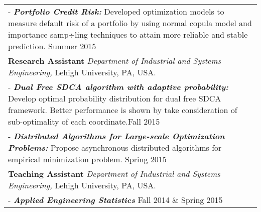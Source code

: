 \documentclass[letters,11pt]{article} %
\begin{document}
\begin{tabular}{p{17.5cm}}
\footnotesize{- \textbf{\emph{Portfolio Credit Risk: }} }
Developed optimization models to measure default risk of a portfolio by using normal copula model and importance samp÷ling techniques to attain more reliable and stable prediction. \hfill{Summer 2015}\\
\textbf{Research Assistant} \emph{Department of Industrial and Systems Engineering,} Lehigh University, PA, USA. \\
\footnotesize{- \textbf{\emph{Dual Free SDCA algorithm with adaptive probability:}} Develop optimal probability distribution for dual free SDCA framework. Better performance is shown by take consideration of sub-optimality of each coordinate.\hfill{Fall 2015}}\\
\footnotesize{- \textbf{\emph{Distributed Algorithms for Large-scale Optimization Problems:}} Propose asynchronous distributed algorithms for empirical minimization problem. \hfill{Spring 2015}}\\
\textbf{Teaching Assistant} \emph{Department of Industrial and Systems Engineering,} Lehigh University, PA, USA. \\
\footnotesize{- \textbf{\emph{Applied Engineering Statistics}} \hfill{Fall 2014 \& Spring 2015}}\\
\end{tabular}
\end{document}
